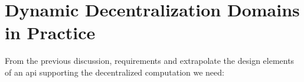 \section{Dynamic Decentralization Domains in Practice}\label{sec:contrib}
\label{ssec:reqs-to-api}

From the previous discussion,
requirements and extrapolate the design elements of an \ac{api}
supporting the decentralized computation we need:
%

